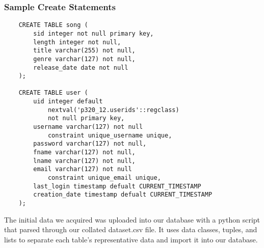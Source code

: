\documentclass[12pt]{article}
\begin{document}
    \subsubsection{Sample Create Statements}


    \begin{lstlisting}
    CREATE TABLE song (
        sid integer not null primary key,
        length integer not null,
        title varchar(255) not null,
        genre varchar(127) not null,
        release_date date not null
    );

    CREATE TABLE user (
        uid integer default
            nextval('p320_12.userids'::regclass)
            not null primary key,
        username varchar(127) not null
            constraint unique_username unique,
        password varchar(127) not null,
        fname varchar(127) not null,
        lname varchar(127) not null,
        email varchar(127) not null
            constraint unique_email unique,
        last_login timestamp defualt CURRENT_TIMESTAMP
        creation_date timestamp defualt CURRENT_TIMESTAMP
    );
    \end{lstlisting}
    The initial data we acquired was uploaded into our database with a python script that parsed through
    our collated dataset.csv file. It uses data classes, tuples, and lists to separate each
    table's representative data and import it into our database.
\end{document}
